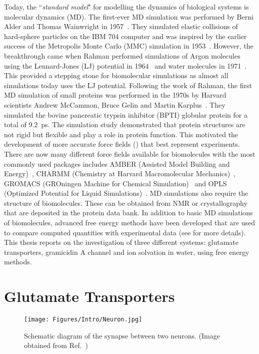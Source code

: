 Today, the ``\textit{standard model}" for modelling the dynamics of biological systems is 
molecular dynamics (MD). The first-ever MD simulation was performed by Berni Alder and Thomas 
Wainwright in 1957~\cite{Alder1959}. They simulated elastic collisions of hard-sphere particles 
on the IBM 704 computer and was inspired by the earlier success of the Metropolis Monte Carlo 
(MMC) simulation in 1953~\cite{Metropolis1953}. However, the breakthrough came when Rahman 
performed simulations of Argon molecules using the Lennard-Jones (LJ) potential in 
1964~\cite{Rahman1964} and water molecules in 1971~\cite{Rahman1971}. This provided a stepping 
stone for biomolecular simulations as almost all simulations today uses the LJ potential. 
Following the work of Rahman, the first MD simulation of small proteins was performed in the 
1970s by Harvard scientists Andrew McCammon, Bruce Gelin and Martin Karplus~\cite{McCammon1977}. 
They simulated the bovine pancreatic trypsin inhibitor (BPTI) globular protein for a total of 
9.2~ps. The simulation study demonstrated that protein structures are not rigid but flexible 
and play a role in protein function. This motivated the development of more accurate force fields 
() that best represent experiments. There are now many different force 
fields available for biomolecules with the most commonly used packages includes AMBER (Assisted 
Model Building and Energy)~\cite{Maier2015}, CHARMM (Chemistry at Harvard Macromolecular 
Mechanics)~\cite{MacKerell1998}, GROMACS (GROningen Machine for Chemical 
Simulation)~\cite{Oostenbrink2004} and OPLS (Optimized Potential for Liquid  
Simulations)~\cite{Robertson2015}. MD simulations also require the structure of biomolecules. 
These can be obtained from NMR or crystallography that are deposited in the protein data bank. 
In addition to basic MD simulations of biomolecules, advanced free energy methods have been 
developed that are used to compare computed quantities with experimental data (see 
 for more details). This thesis reports on the investigation of three 
different systems: glutamate transporters, gramicidin A channel and ion solvation in water, 
using free energy methods.

\section{Glutamate Transporters}
\begin{figure}[b!]
\centering
\texttt{[image: Figures/Intro/Neuron.jpg]}
\caption{Schematic diagram of the synapse between two neurons. 
(Image obtained from Ref.~\cite{Splettstoesser2017})}
\label{intro:neuron}
\end{figure}

